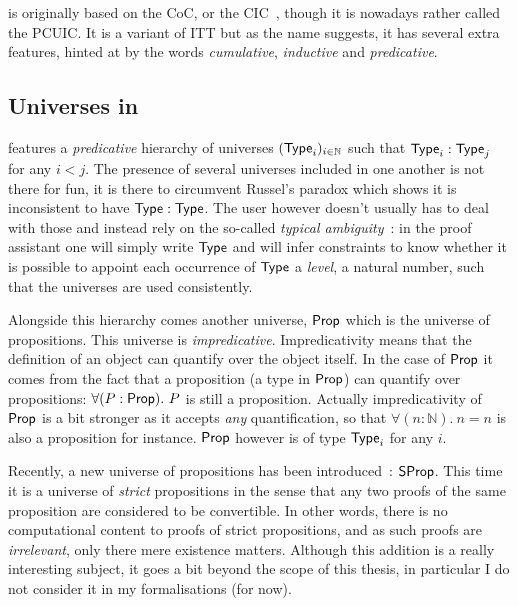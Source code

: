 \Coq is originally based on the \acrfull{CoC}, or the
\acrfull{CIC}~, though it is nowadays rather
called the \acrfull{PCUIC}.
It is a variant of \acrshort{ITT} but as the name suggests, it has several
extra features, hinted at by the words \emph{cumulative}, \emph{inductive}
and \emph{predicative}.

\subsection{Universes in \Coq}

\Coq features a \emph{predicative} hierarchy of universes
\((\mathsf{Type}_i)_{i \in \mathbb{N}}\) such that \(\mathsf{Type}_i : \mathsf{Type}_j\) for any
\(i < j\). The presence of several universes included in one another is not
there for fun, it is there to circumvent Russel's paradox which
shows it is inconsistent to have \(\mathsf{Type} : \mathsf{Type}\).
The \Coq user however doesn't usually has to deal with those and
instead rely on the so-called
\emph{typical ambiguity}~:
in the \Coq proof assistant one will simply write \(\mathsf{Type}\) and \Coq will infer
constraints to know whether it is possible to appoint each occurrence of
\(\mathsf{Type}\) a \emph{level}, \ie a natural number, such that the universes are used
consistently.

Alongside this hierarchy comes another universe, \(\mathsf{Prop}\) which is the universe
of propositions. This universe is \emph{impredicative}.
Impredicativity means that the definition of an object can quantify over the
object itself. In the case of \(\mathsf{Prop}\) it comes from the fact that a
proposition (\ie a type in \(\mathsf{Prop}\)) can quantify over propositions: \eg
\(\forall (P : \mathsf{Prop}).\ P\) is still a proposition.
Actually impredicativity of \(\mathsf{Prop}\) is a bit stronger as it accepts \emph{any}
quantification, so that \(\forall (n : \mathbb{N}).\ n = n\) is also a
proposition for instance.
\(\mathsf{Prop}\) however is of type \(\mathsf{Type}_i\) for any \(i\).

Recently, a new universe of propositions has been
introduced~: \(\mathsf{SProp}\).
This time it is a universe of \emph{strict} propositions in the sense that any
two proofs of the same proposition are considered to be convertible.
In other words, there is no computational content to proofs of strict
propositions, and as such proofs are \emph{irrelevant}, only there mere
existence matters.
Although this addition is a really interesting subject, it goes a bit beyond
the scope of this thesis, in particular I do not consider it in my
formalisations (for now).

